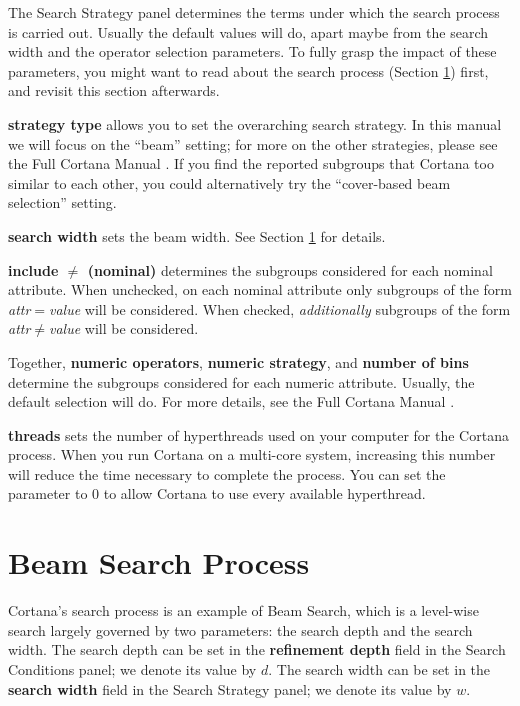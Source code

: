\documentclass{article}
\begin{document}
The Search Strategy panel determines the terms under which the search
process is carried out.  Usually the default values will do, apart maybe
from the search width and the operator selection parameters. To fully grasp
the impact of these parameters, you might want to read about the search
process (Section \ref{sec:searchprocess}) first, and revisit this section
afterwards.

\textbf{strategy type} allows you to set the overarching search strategy. 
In this manual we will focus on the ``beam'' setting; for more on the other
strategies, please see the Full Cortana Manual \cite{full}.  If you find the reported
subgroups that Cortana too similar to each other, you could alternatively
try the ``cover-based beam selection'' setting.

\textbf{search width} sets the beam width. See Section
\ref{sec:searchprocess} for details.

\textbf{include $\neq$ (nominal)} determines the subgroups considered for
each nominal attribute.  When unchecked, on each nominal attribute only
subgroups of the form \emph{attr}$=$\emph{value} will be considered.  When
checked, \emph{additionally} subgroups of the form
\emph{attr}$\neq$\emph{value} will be considered.

Together, \textbf{numeric operators}, \textbf{numeric strategy}, and
\textbf{number of bins} determine the subgroups considered for each numeric
attribute.  Usually, the default selection will do.  For more details, see
the Full Cortana Manual \cite{full}.

\textbf{threads} sets the number of hyperthreads used on your computer for
the Cortana process.  When you run Cortana on a multi-core system,
increasing this number will reduce the time necessary to complete the
process.  You can set the parameter to $0$ to allow Cortana to use every
available hyperthread.

\section{Beam Search Process}
\label{sec:searchprocess}

Cortana's search process is an example of Beam Search, which is a level-wise
search largely governed by two parameters: the \gls{search depth} and the
\gls{search width}.  The search depth can be set in the \textbf{refinement
depth} field in the Search Conditions panel; we denote its value by $d$. 
The search width can be set in the \textbf{search width} field in the Search
Strategy panel; we denote its value by $w$.
\end{document}
